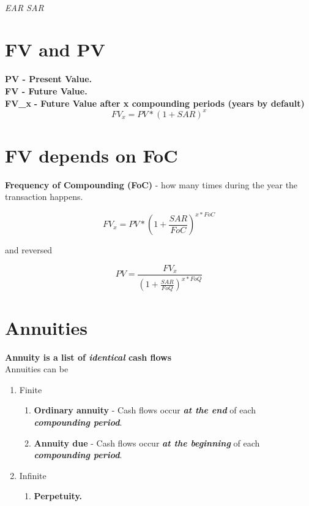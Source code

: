 \documentclass{article}
\begin{document}
\\

\textit{EAR \geq SAR}

\section{FV and PV}
\textbf{PV - Present Value.}\\
\textbf{FV - Future Value.}\\
\textbf{FV_x} \textbf{ - Future Value after x compounding periods (years by default)}\\

\[FV_x = PV * (1 + SAR)^x\]

\section{FV depends on FoC}

\textbf{Frequency of Compounding (FoC)} - how many times during the year the transaction happens.

\[FV_x = PV * (1 + \frac{SAR}{FoC})^{x*FoC} \]


\textnormal{and reversed}

\[PV = \frac{FV_x}{(1 + \frac{SAR}{FoQ})^{x*FoQ} } \]


\section{Annuities}
\textnormal{\textbf{Annuity is a list of \textit{identical} cash flows}}\\

\textnormal{Annuities can be}
\begin{enumerate}
    \item \textnormal{Finite}
    \begin{enumerate}
        \item \textnormal{\textbf{Ordinary annuity} - Cash flows occur \textbf{\textit{at the end}} of each \textbf{\textit{compounding period}}.}
        \item \textnormal{\textbf{Annuity due} - Cash flows occur \textbf{\textit{at the beginning}} of each \textbf{\textit{compounding period}}.}
    \end{enumerate}
    \item \textnormal{Infinite}
    \begin{enumerate}
    \item \textnormal{\textbf{Perpetuity.}}
    \end{enumerate}
    
\end{enumerate}
\end{document}
